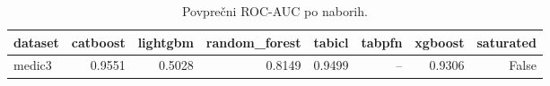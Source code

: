 \begin{table}[htbp]
\centering
\caption{Povprečni ROC-AUC po naborih.}
\label{tab:pivot}
\begin{tabular}{lrrrrrrr}
\hline
dataset & catboost & lightgbm & random\_forest & tabicl & tabpfn & xgboost & saturated \\
\hline
medic3 & 0.9551 & 0.5028 & 0.8149 & 0.9499 & -- & 0.9306 & False \\
\hline
\end{tabular}
\end{table}
